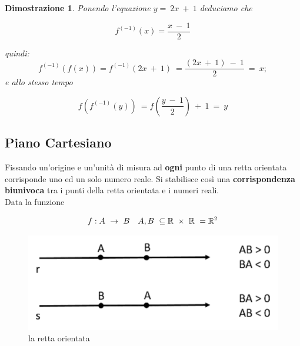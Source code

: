 \documentclass[12pt, a4paper]{article}
\theoremstyle{break}
\theoremstyle{lemma}
\theoremstyle{lemma}
\newtheorem{dimo}{Dimostrazione}
\theoremstyle{lemma}
\begin{document}
\begin{dimo}
Ponendo l'equazione $ y =\ 2x\ +\ 1$ deduciamo che

	\begin{equation}
  		f^{(-1)}(x) = \frac{x\ -\ 1}{2}
	\end{equation}

\vspace{1.5mm}
quindi:
\begin{equation}
  f^{(-1)}(f(x))= f^{(-1)}(2x\ +\ 1)\ = \frac{(2x\ +\ 1)\ -\ 1}{2}\ =\ x;
\end{equation}
\vspace{1.5mm}
e allo stesso tempo

\vspace{1.5mm}
\begin{equation}
f(f^{(-1)}(y))\ = f(\frac{y\ -\ 1}{2})\ +\ 1\ =\ y
\end{equation}
\end{dimo}

\subsection{Piano Cartesiano}
Fissando un'origine e un'unità di misura ad \textbf{ogni} punto di una retta orientata corrisponde uno ed un solo numero reale.
Si stabilisce così una \textbf{corrispondenza biunivoca} tra i punti della retta orientata e i numeri reali.\\
Data la funzione
\vspace{1.5mm}

\begin{equation}
  f: A\ \rightarrow\ B \quad A,B\ \subseteq \mathbb{R}\ \times\ \mathbb{R}\ = \mathbb{R}^2\\
\end{equation}

\begin{figure}[ht]
  \center
  \includegraphics[scale=0.25]{rettaorientata}
  \caption{la retta orientata}
  \label{fig:retta_orientata}
\end{figure}
\end{document}

